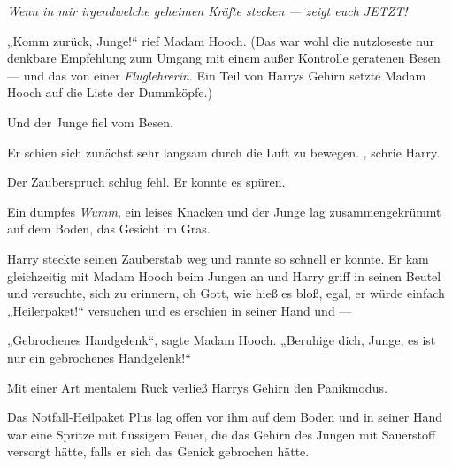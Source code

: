 \emph{Wenn in mir irgendwelche geheimen Kräfte stecken — zeigt euch JETZT!}

„Komm zurück, Junge!“ rief Madam Hooch. (Das war wohl die nutzloseste nur denkbare Empfehlung zum Umgang mit einem außer Kontrolle geratenen Besen — und das von einer \emph{Fluglehrerin}. Ein Teil von Harrys Gehirn setzte Madam Hooch auf die Liste der Dummköpfe.)

Und der Junge fiel vom Besen.

Er schien sich zunächst sehr langsam durch die Luft zu bewegen.
, schrie Harry.

Der Zauberspruch schlug fehl. Er konnte es spüren.

Ein dumpfes \emph{Wumm}, ein leises Knacken und der Junge lag zusammengekrümmt auf dem Boden, das Gesicht im Gras.

Harry steckte seinen Zauberstab weg und rannte so schnell er konnte. Er kam gleichzeitig mit Madam Hooch beim Jungen an und Harry griff in seinen Beutel und versuchte, sich zu erinnern, oh Gott, wie hieß es bloß, egal, er würde einfach
„Heilerpaket!“ versuchen und es erschien in seiner Hand und —

„Gebrochenes Handgelenk“, sagte Madam Hooch.
„Beruhige dich, Junge, es ist nur ein gebrochenes Handgelenk!“

Mit einer Art mentalem Ruck verließ Harrys Gehirn den Panikmodus.

Das Notfall-Heilpaket Plus lag offen vor ihm auf dem Boden und in seiner Hand war eine Spritze mit flüssigem Feuer, die das Gehirn des Jungen mit Sauerstoff versorgt hätte, falls er sich das Genick gebrochen hätte.

